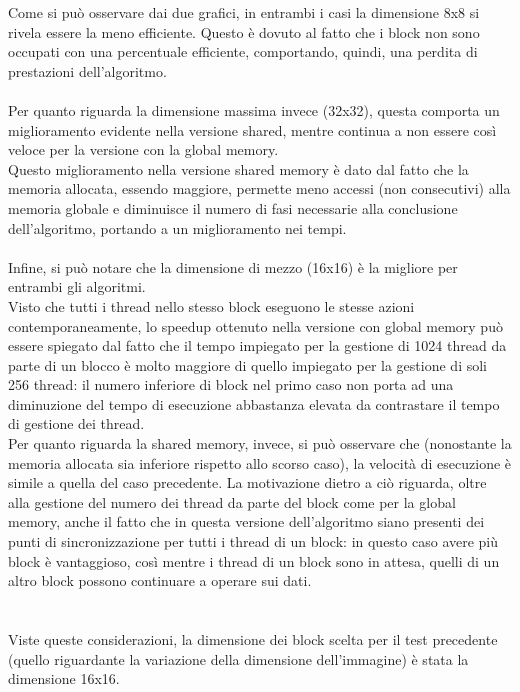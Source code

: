 \documentclass[10pt,twocolumn,letterpaper]{article}
\begin{document}
Come si può osservare dai due grafici, in entrambi i casi la dimensione 8x8 si rivela essere la meno efficiente. Questo è dovuto al fatto che i block non sono occupati con una percentuale efficiente, comportando, quindi, una perdita di prestazioni dell'algoritmo.\\
\\
Per quanto riguarda la dimensione massima invece (32x32), questa comporta un miglioramento evidente nella versione shared, mentre continua a non essere così veloce per la versione con la global memory.\\
Questo miglioramento nella versione shared memory è dato dal fatto che la memoria allocata, essendo maggiore, permette meno accessi (non consecutivi) alla memoria globale e diminuisce il numero di fasi necessarie alla conclusione dell'algoritmo, portando a un miglioramento nei tempi.\\
\\
Infine, si può notare che la dimensione di mezzo (16x16) è la migliore per entrambi gli algoritmi.\\
Visto che tutti i thread nello stesso block eseguono le stesse azioni contemporaneamente, lo speedup ottenuto nella versione con global memory può essere spiegato dal fatto che il tempo impiegato per la gestione di 1024 thread da parte di un blocco è molto maggiore di quello impiegato per la gestione di soli 256 thread: il numero inferiore di block nel primo caso non porta ad una diminuzione del tempo di esecuzione abbastanza elevata da contrastare il tempo di gestione dei thread.\\
Per quanto riguarda la shared memory, invece, si può osservare che (nonostante la memoria allocata sia inferiore rispetto allo scorso caso), la velocità di esecuzione è simile a quella del caso precedente. La motivazione dietro a ciò riguarda, oltre alla gestione del numero dei thread da parte del block come per la global memory, anche il fatto che in questa versione dell'algoritmo siano presenti dei punti di sincronizzazione per tutti i thread di un block: in questo caso avere più block è vantaggioso, così mentre i thread di un block sono in attesa, quelli di un altro block possono continuare a operare sui dati.\\
\\
\\
Viste queste considerazioni, la dimensione dei block scelta per il test precedente (quello riguardante la variazione della dimensione dell'immagine) è stata la dimensione 16x16.\\
\end{document}
